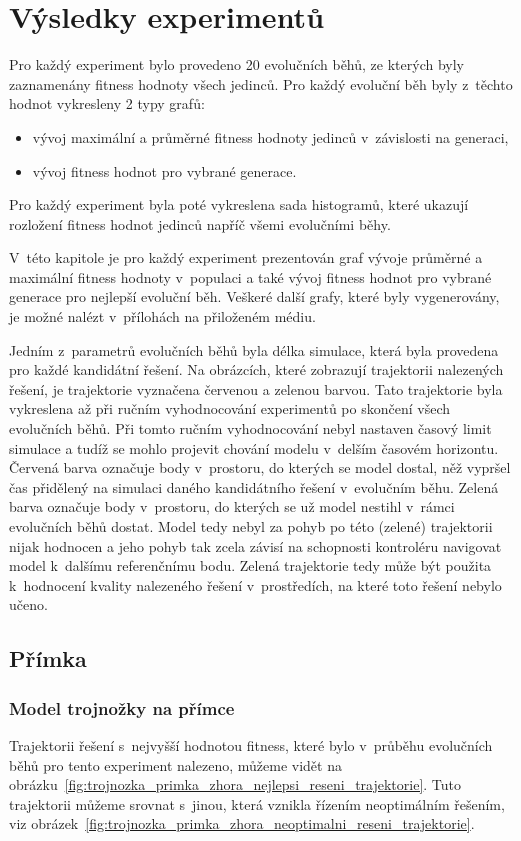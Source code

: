 \chapter{Výsledky experimentů}
\label{chap:vysledky}
Pro každý experiment bylo provedeno 20 evolučních běhů, ze kterých byly zaznamenány fitness hodnoty všech jedinců.
Pro každý evoluční běh byly z~těchto hodnot vykresleny 2 typy grafů:

\begin{itemize}
    \item vývoj maximální a průměrné fitness hodnoty jedinců v~závislosti na generaci,
    \item vývoj fitness hodnot pro vybrané generace.
\end{itemize}

Pro každý experiment byla poté vykreslena sada histogramů, které ukazují rozložení fitness hodnot jedinců napříč všemi evolučními běhy.

V~této kapitole je pro každý experiment prezentován graf vývoje průměrné a maximální fitness hodnoty v~populaci a také vývoj fitness hodnot pro vybrané generace pro nejlepší evoluční běh.
Veškeré další grafy, které byly vygenerovány, je možné nalézt v~přílohách na přiloženém médiu.

Jedním z~parametrů evolučních běhů byla délka simulace, která byla provedena pro každé kandidátní řešení.
Na obrázcích, které zobrazují trajektorii nalezených řešení, je trajektorie vyznačena červenou a zelenou barvou.
Tato trajektorie byla vykreslena až při ručním vyhodnocování experimentů po skončení všech evolučních běhů.
Při tomto ručním vyhodnocování nebyl nastaven časový limit simulace a tudíž se mohlo projevit chování modelu v~delším časovém horizontu.
Červená barva označuje body v~prostoru, do kterých se model dostal, něž vypršel čas přidělený na simulaci daného kandidátního řešení v~evolučním běhu.
Zelená barva označuje body v~prostoru, do kterých se už model nestihl v~rámci evolučních běhů dostat.
Model tedy nebyl za pohyb po této (zelené) trajektorii nijak hodnocen a jeho pohyb tak zcela závisí na schopnosti kontroléru navigovat model k~dalšímu referenčnímu bodu.
Zelená trajektorie tedy může být použita k~hodnocení kvality nalezeného řešení v~prostředích, na které toto řešení nebylo učeno.

\section{Přímka}

\subsection{Model trojnožky na přímce}
Trajektorii řešení s~nejvyšší hodnotou fitness, které bylo v~průběhu evolučních běhů pro tento experiment nalezeno, můžeme vidět na obrázku~\ref{fig:trojnozka_primka_zhora_nejlepsi_reseni_trajektorie}.
Tuto trajektorii můžeme srovnat s~jinou, která vznikla řízením neoptimálním řešením, viz obrázek~\ref{fig:trojnozka_primka_zhora_neoptimalni_reseni_trajektorie}.

